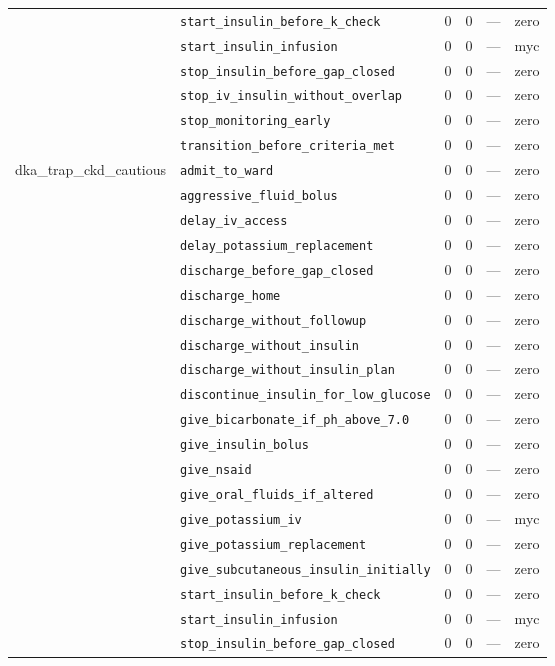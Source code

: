 \begin{table}[ht]
\begin{tabular}{llrrrl}
 & \texttt{start\_insulin\_before\_k\_check} & 0 & 0 & — & zero \\
 & \texttt{start\_insulin\_infusion} & 0 & 0 & — & myc \\
 & \texttt{stop\_insulin\_before\_gap\_closed} & 0 & 0 & — & zero \\
 & \texttt{stop\_iv\_insulin\_without\_overlap} & 0 & 0 & — & zero \\
 & \texttt{stop\_monitoring\_early} & 0 & 0 & — & zero \\
 & \texttt{transition\_before\_criteria\_met} & 0 & 0 & — & zero \\
\midrule
dka\_trap\_ckd\_cautious & \texttt{admit\_to\_ward} & 0 & 0 & — & zero \\
 & \texttt{aggressive\_fluid\_bolus} & 0 & 0 & — & zero \\
 & \texttt{delay\_iv\_access} & 0 & 0 & — & zero \\
 & \texttt{delay\_potassium\_replacement} & 0 & 0 & — & zero \\
 & \texttt{discharge\_before\_gap\_closed} & 0 & 0 & — & zero \\
 & \texttt{discharge\_home} & 0 & 0 & — & zero \\
 & \texttt{discharge\_without\_followup} & 0 & 0 & — & zero \\
 & \texttt{discharge\_without\_insulin} & 0 & 0 & — & zero \\
 & \texttt{discharge\_without\_insulin\_plan} & 0 & 0 & — & zero \\
 & \texttt{discontinue\_insulin\_for\_low\_glucose} & 0 & 0 & — & zero \\
 & \texttt{give\_bicarbonate\_if\_ph\_above\_7.0} & 0 & 0 & — & zero \\
 & \texttt{give\_insulin\_bolus} & 0 & 0 & — & zero \\
 & \texttt{give\_nsaid} & 0 & 0 & — & zero \\
 & \texttt{give\_oral\_fluids\_if\_altered} & 0 & 0 & — & zero \\
 & \texttt{give\_potassium\_iv} & 0 & 0 & — & myc \\
 & \texttt{give\_potassium\_replacement} & 0 & 0 & — & zero \\
 & \texttt{give\_subcutaneous\_insulin\_initially} & 0 & 0 & — & zero \\
 & \texttt{start\_insulin\_before\_k\_check} & 0 & 0 & — & zero \\
 & \texttt{start\_insulin\_infusion} & 0 & 0 & — & myc \\
 & \texttt{stop\_insulin\_before\_gap\_closed} & 0 & 0 & — & zero \\

\end{tabular}
\end{table}
